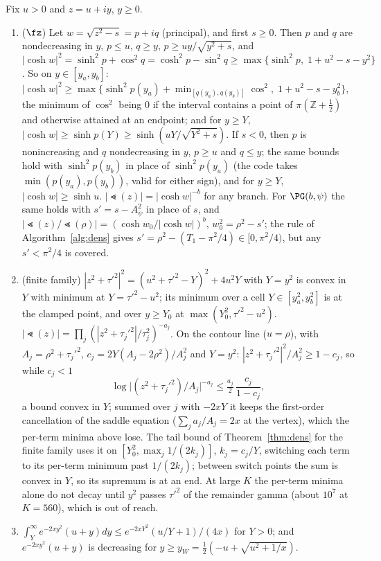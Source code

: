 \begin{lemma}\label{lem:maj}
Fix $u>0$ and $z=u+iy$, $y\ge0$.
\begin{enumerate}[label=(\alph*)]
\item ($\fz$) Let $w=\sqrt{z^2-s}=p+iq$ (principal), and first $s\ge0$. Then $p$ and $q$ are nondecreasing in $y$, $p\le u$, $q\ge
y$, $p\ge uy/\sqrt{y^2+s}$, and $|\cosh w|^2=\sinh^2p+\cos^2q=\cosh^2p-\sin^2q\ge\max\{\sinh^2p,\;1+u^2-s-y^2\}$.
So on $y\in[y_a,y_b]$: $|\cosh w|^2\ge\max\{\sinh^2p(y_a)+\min_{[q(y_a),q(y_b)]}\cos^2,\;1+u^2-s-y_b^2\}$, the
minimum of $\cos^2$ being 0 if the interval contains a point of $\pi(\mathbb Z+\frac12)$ and otherwise attained
at an endpoint; and for $y\ge Y$, $|\cosh w|\ge\sinh p(Y)\ge\sinh(uY/\sqrt{Y^2+s})$. If $s<0$, then $p$ is
nonincreasing and $q$ nondecreasing in $y$, $p\ge u$ and $q\le y$; the same bounds hold with $\sinh^2p(y_b)$ in place
of $\sinh^2p(y_a)$ (the code takes $\min(p(y_a),p(y_b))$, valid for either sign), and for $y\ge Y$,
$|\cosh w|\ge\sinh u$. $|\Lt(z)|=|\cosh w|^{-b}$ for any branch. For $\PG(b,\psi)$ the same holds with $s'=s-A_\psi^2$ in place of $s$, and
$|\Lt(z)/\Lt(\rho)|=(\cosh w_0/|\cosh w|)^b$, $w_0^2=\rho^2-s'$; the rule of Algorithm~\ref{alg:dens} gives
$s'=\rho^2-(T_1-\pi^2/4)\in[0,\pi^2/4)$, but any $s'<\pi^2/4$ is covered.
\item (finite family) $|z^2+\tau'^2|^2=(u^2+\tau'^2-Y)^2+4u^2Y$ with $Y=y^2$ is convex in $Y$ with minimum at
$Y=\tau'^2-u^2$; its minimum over a cell $Y\in[y_a^2,y_b^2]$ is at the clamped point, and over $y\ge Y_0$ at
$\max(Y_0^2,\tau'^2-u^2)$. $|\Lt(z)|=\prod_j(|z^2+\tau_j'^2|/\tau_j^2)^{-a_j}$. On the contour line ($u=\rho$), with $A_j=\rho^2+\tau_j'^2$,
$c_j=2Y(A_j-2\rho^2)/A_j^2$ and $Y=y^2$: $|z^2+\tau_j'^2|^2/A_j^2\ge1-c_j$, so while $c_j<1$
\[\log\bigl|(z^2+\tau_j'^2)/A_j\bigr|^{-a_j}\le\tfrac{a_j}2\,\frac{c_j}{1-c_j},\]
a bound convex in $Y$; summed over $j$ with $-2xY$ it keeps the first-order cancellation of the saddle equation
($\sum_ja_j/A_j=2x$ at the vertex), which the per-term minima above lose. The tail bound of
Theorem~\ref{thm:dens} for the finite family uses it on $[Y_0^2,\max_j1/(2k_j)]$, $k_j=c_j/Y$, switching each
term to its per-term minimum past $1/(2k_j)$; between switch points the sum is convex in $Y$, so its supremum is at
an end. At large $K$ the per-term minima alone do not decay until $y^2$ passes $\tau'^2$ of the remainder gamma
(about $10^7$ at $K=560$), which is out of reach.
\item $\int_Y^\infty e^{-2xy^2}(u+y)dy\le e^{-2xY^2}(u/Y+1)/(4x)$ for $Y>0$; and $e^{-2xy^2}(u+y)$ is decreasing for
$y\ge y_W=\frac12(-u+\sqrt{u^2+1/x})$.
\end{enumerate}
\end{lemma}

